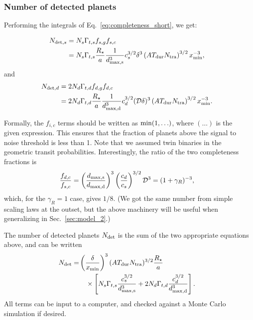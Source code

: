 \documentclass{emulateapj}
\begin{document}
\subsubsection{Number of detected planets}

Performing the integrals of Eq.~\ref{eq:completeness_short}, we get:

\begin{align}
N_{{\rm det},s} &= N_s \Gamma_{t,s} f_{s,g} f_{s,c} \\
&= N_s \Gamma_{t,s} \frac{R_\star}{a} \frac{1}{d_{\rm max,s}^3} c_s^{3/2} 
\delta^3 \left(A 
T_{\rm dur} N_{\rm tra}\right)^{3/2} x_{\rm min}^{-3},
\end{align}
and
\begin{align}
N_{{\rm det},d} &= 2 N_d \Gamma_{t,d} f_{d,g} f_{d,c} \\
&= 2 N_d \Gamma_{t,d} \frac{R_\star}{a}
\frac{1}{d_{\rm max,d}^3} c_d^{3/2} (\mathcal{D}\delta)^3 \left(A T_{\rm dur} 
N_{\rm tra}\right)^{3/2} x_{\rm min}^{-3}.
\end{align}

Formally, the $f_{i,c}$ terms should be written as ${\rm min}(1, \ldots)$, 
where $(\ldots)$ is the given expression. This ensures that the fraction of 
planets above the signal to noise threshold is less than 1.
Note that we assumed twin binaries in the geometric transit probabilities.
Interestingly, the ratio of the two completeness fractions is
\begin{equation}
\frac{f_{d,c}}{f_{s,c}} = \left(\frac{d_{\rm max,s}}{d_{\rm max,d}}\right)^3 
\left(\frac{c_d}{c_s}\right)^{3/2} \mathcal{D}^3 = (1+\gamma_R)^{-3},
\end{equation}
which, for the $\gamma_R = 1$ case, gives 
$1/8$. (We got the same number from simple scaling laws at the outset, but the 
above machinery will be useful when generalizing in Sec.~\ref{sec:model_2}.)

The number of detected planets $N_{\rm det}$ is the sum of the two appropriate 
equations above, and can be written
\begin{align}
N_{\rm det} = 
&\left( \frac{\delta}{x_{\rm min}} \right)^3 (A T_{\rm dur} N_{\rm tra})^{3/2}
\frac{R_\star}{a}
\nonumber\\
&\quad \times
\left[ N_s \Gamma_{t,s} \frac{c_s^{3/2}}{d_{\rm max,s}^3}  +
	   2 N_d \Gamma_{t,d} \frac{c_d^{3/2}}{d_{\rm max,d}^3}  \right].
\label{eq:N_det}
\end{align}
All terms can be input to a computer, and checked against a Monte Carlo 
simulation if desired.
\end{document}
